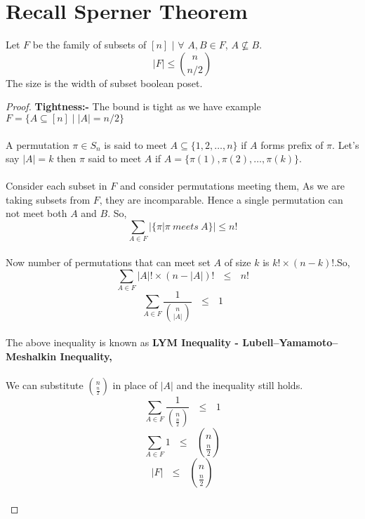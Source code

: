 
\section{Recall Sperner Theorem}
\begin{theorem}
Let $F$ be the family of subsets of $[n]$ $|$ $\forall$ $A,B \in F$, $A \nsubseteq B$.
$$|F| \le {n\choose{n/2}}$$
The size is the width of subset boolean poset.
\begin{proof}
\textbf{Tightness:-} The bound is tight as we have example $F=\{A\subseteq [n] \mid \left |A\right |=n/2\}$\\\\
 A permutation $\pi \in S_n$ is said to meet $A \subseteq \{1,2,\ldots,n\}$ if $A$ forms prefix of $\pi$. Let's say $|A| = k$ then $\pi$ said to meet $A$ if $A = \{\pi(1),\pi(2),\ldots,\pi(k)\}$.\\\\
Consider each subset in $F$ and consider permutations meeting them, As we are taking subsets from $F$, they are incomparable. Hence a single permutation can not meet both $A$ and $B$. So,
$$\sum_{A\in F} \bigg|\{\pi | \pi ~meets~ A\}\bigg| \leq n!$$\\
Now number of permutations that can meet set $A$ of size $k$ is $k! \times (n-k)!$.So,
$$\sum_{A\in F} |A|! \times (n-|A|)! ~~~\leq~~~ n!$$
$$\boxed{\sum_{A\in F} \frac{1}{{n \choose {|A|}}} ~~~ \leq ~~~ 1}$$\\
The above inequality is known as \textbf{LYM Inequality -  Lubell–Yamamoto–Meshalkin Inequality,}\\\\
We can substitute $n \choose \frac{n}{2}$ in place of $|A|$ and the inequality still holds.
$$\sum_{A\in F} \frac{1}{{n \choose \frac{n}{2}}} ~~~ \leq ~~~ 1$$
$$\sum_{A\in F} 1  ~~~ \leq ~~~ {n \choose \frac{n}{2}}$$
$$|F| ~~~\leq~~~ {n \choose \frac{n}{2}}$$\\
\end{proof}
\end{theorem}
